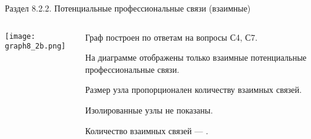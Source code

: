 \begin{frame}{Раздел 8.2.2. Потенциальные профессиональные связи (взаимные)}

\begin{columns} 
\begin{column}{0.75\textwidth}
\centering
          \texttt{[image: graph8\_2b.png]}
\end{column}
\begin{column}{0.25\textwidth} 

\tiny
Граф  построен по ответам на вопросы С4, С7.
\smallskip

На диаграмме отображены только взаимные потенциальные профессиональные связи.
\smallskip

Размер узла пропорционален количеству взаимных связей.
\smallskip

Изолированные узлы не показаны.
\bigskip

Количество взаимных связей --- \valHBBlinks.


\end{column}
\end{columns}
\end{frame}


